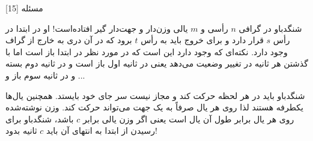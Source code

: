 ‌مسئله [15]


% 
%
%
% 

شنگدباو در گرافی $n$ رأسی و $m$ یالی وزن‌دار و جهت‌دار گیر افتاده‌است! او در ابتدا در رأس $s$ قرار دارد و برای خروج باید به رأس $t$ برود که در آن دری به خارج از گراف وجود دارد. نکته‌ای که وجود دارد این است که در مورد نظر در ابتدا باز است اما با گذشتن هر ثانیه در تغییر وضعیت می‌دهد یعنی در ثانیه اول باز است و در ثانیه دوم بسته و در ثانیه سوم باز و ... 

شنگدباو باید در هر لحظه حرکت کند و مجاز نیست سر جای خود بایستد. همچنین یال‌ها یکطرفه هستند لذا روی هر یال صرفاً به یک جهت می‌تواند حرکت کند. وزن نوشته‌شده روی هر یال برابر طول آن یال است یعنی اگر وزن یالی برابر $c$ باشد، شنگدباو برای رسیدن از ابتدا به انتهای آن باید $c$ ثانیه بدود!

